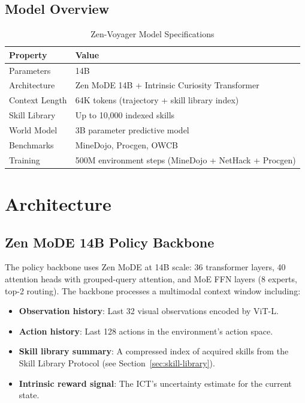 \documentclass[11pt,a4paper]{article}
\begin{document}
\subsection{Model Overview}

\begin{table}[H]
\centering
\begin{tabular}{ll}
\toprule
\textbf{Property} & \textbf{Value} \\
\midrule
Parameters & 14B \\
Architecture & Zen MoDE 14B + Intrinsic Curiosity Transformer \\
Context Length & 64K tokens (trajectory + skill library index) \\
Skill Library & Up to 10,000 indexed skills \\
World Model & 3B parameter predictive model \\
Benchmarks & MineDojo, Procgen, OWCB \\
Training & 500M environment steps (MineDojo + NetHack + Procgen) \\
\bottomrule
\end{tabular}
\caption{Zen-Voyager Model Specifications}
\end{table}

\section{Architecture}

\subsection{Zen MoDE 14B Policy Backbone}

The policy backbone uses Zen MoDE at 14B scale: 36 transformer layers, 40 attention heads with
grouped-query attention, and MoE FFN layers (8 experts, top-2 routing). The backbone processes
a multimodal context window including:

\begin{itemize}
    \item \textbf{Observation history}: Last 32 visual observations encoded by ViT-L.
    \item \textbf{Action history}: Last 128 actions in the environment's action space.
    \item \textbf{Skill library summary}: A compressed index of acquired skills from the
    Skill Library Protocol (see Section~\ref{sec:skill-library}).
    \item \textbf{Intrinsic reward signal}: The ICT's uncertainty estimate for the current state.
\end{itemize}
\end{document}
